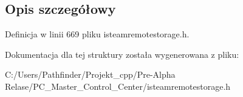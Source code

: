 \subsection{Opis szczegółowy}


Definicja w linii 669 pliku isteamremotestorage.\+h.



Dokumentacja dla tej struktury została wygenerowana z pliku\+:\begin{DoxyCompactItemize}
\item 
C\+:/\+Users/\+Pathfinder/\+Projekt\+\_\+cpp/\+Pre-\/\+Alpha Relase/\+P\+C\+\_\+\+Master\+\_\+\+Control\+\_\+\+Center/isteamremotestorage.\+h\end{DoxyCompactItemize}
